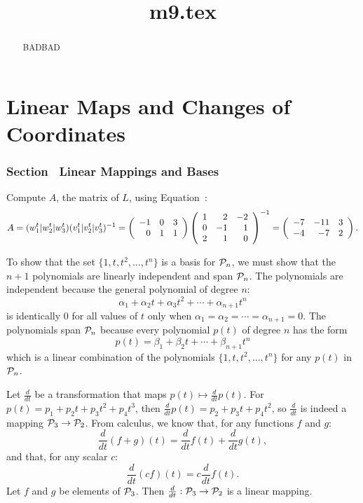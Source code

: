 \documentclass{ximera}
\title{m9.tex}
\begin{document}
\begin{abstract}
BADBAD
\end{abstract}
\maketitle

\chapter{Linear Maps and Changes of Coordinates}

\subsection*{Section~\protect{\ref{Sect:linmap}} Linear Mappings and Bases}

Compute $A$, the matrix of $L$, using Equation~:
\[ A = (w_1^t|w_2^t|w_3^t)(v_1^t|v_2^t|v_3^t)^{-1} =
\left(\begin{array}{rrr} -1 & 0 & 3 \\ 0 & 1 & 1 \end{array}\right)
\left(\begin{array}{rrr} 1 & 2 & -2 \\ 0 & -1 & 1 \\ 2 & 1 & 0\end{array}\right)^{-1} =
\left(\begin{array}{rrr} -7 & -11 & 3 \\ -4 & -7 & 2
\end{array}\right). \]

To show that the set $\{1,t,t^2,\dots,t^n\}$ is a basis for
${\cal P}_n$, we must show that the $n + 1$ polynomials are
linearly independent and span ${\cal P}_n$.  The polynomials are
independent because the general polynomial of degree $n$:
\[
\alpha_1 + \alpha_2t + \alpha_3t^2 + \cdots + \alpha_{n+1}t^n
\]
is identically $0$ for all values of $t$ only when $\alpha_1 =
\alpha_2 = \cdots = \alpha_{n + 1} = 0$.  The polynomials span
${\cal P}_n$ because every polynomial $p(t)$ of degree $n$ has
the form
\[ p(t) = \beta_1 + \beta_2t + \cdots + \beta_{n + 1}t^n \]
which is a linear combination of the polynomials
$\{1,t,t^2,\dots,t^n\}$ for any $p(t)$ in ${\cal P}_n$.

Let $\frac{d}{dt}$ be a transformation that maps $p(t) \mapsto
\frac{d}{dt}p(t)$.  For $p(t) =  p_1 + p_2t + p_3t^2 + p_4t^3$, then
$\frac{d}{dt}p(t) = p_2 + p_3t + p_4t^2$, so $\frac{d}{dt}$ is indeed
a mapping ${\cal P}_3 \rightarrow {\cal P}_2$.  From calculus, we
know that, for any functions $f$ and $g$:
\[ \frac{d}{dt}(f + g)(t) = \frac{d}{dt}f(t) + \frac{d}{dt}g(t), \]
and that, for any scalar $c$:
\[ \frac{d}{dt}(cf)(t) = c\frac{d}{dt}f(t). \]
Let $f$ and $g$ be elements of ${\cal P}_3$.  Then
$\frac{d}{dt}: {\cal P}_3 \rightarrow {\cal P}_2$ is a linear mapping.
\end{document}
